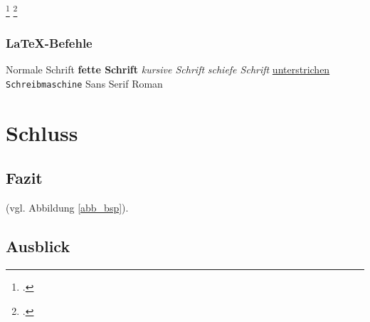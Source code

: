 \Blindtext\footcite[][34]{Digitaloekonomie}
\blinditemize
\blindtext\footcite[][511]{Tanenbaum2016}

\subsubsection{LaTeX-Befehle}
 \textnormal{Normale Schrift} 
 \textbullet\addspace \textbf{fette Schrift} 
 \textbullet\addspace \textit{kursive Schrift} 
 \textbullet\addspace \textsl{schiefe Schrift} 
 \textbullet\addspace \underline{unterstrichen} 
 \textbullet\addspace \texttt{Schreib\-ma\-schi\-ne} 
 \textbullet\addspace \textsf{Sans Serif} 
 \textbullet\addspace \textrm{Roman} 

\section{Schluss}
\subsection{Fazit}
\blindtext (vgl. Abbildung \ref{abb_bsp}).

\subsection{Ausblick}
\blindtext
